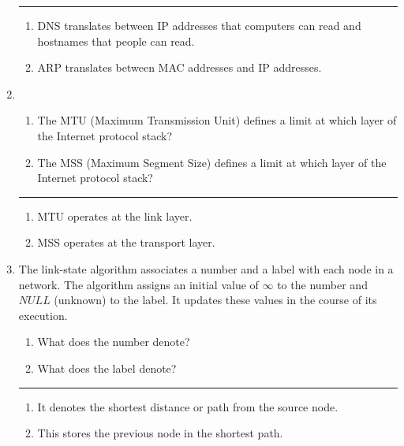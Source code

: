 \documentclass[twoside]{article}
\newenvironment{answer}
  {\vspace*{0.2cm} \rule{12cm}{0.04cm} \vspace*{0.2cm}}
  {\vspace*{0.2cm}}
\begin{document}
\begin{enumerate}
  \begin{answer}

  \begin{enumerate}
    \item DNS translates between IP addresses that computers can read and hostnames that people can read.
    \item ARP translates between MAC addresses and IP addresses.
    \end{enumerate}

    \end{answer}

  \item 
  \begin{enumerate}
    \item The MTU (Maximum Transmission Unit) defines a limit at which
      layer of the Internet protocol stack?
    \item The MSS (Maximum Segment Size) defines a limit at which
      layer of the Internet protocol stack?
    \end{enumerate}

  \begin{answer}

  \begin{enumerate}
    \item MTU operates at the link layer.
    \item MSS operates at the transport layer.
    \end{enumerate}

    \end{answer}

  \item The link-state algorithm associates a number and a label with
    each node in a network. The algorithm assigns an initial value
    of $\infty$ to the number and $NULL$ (unknown) to the label.
    It updates these values in the course of its execution.
  \begin{enumerate}
    \item What does the number denote?
    \item What does the label denote?
    \end{enumerate}
  
  \begin{answer}

  \begin{enumerate}
    \item It denotes the shortest distance or path from the source node.
    \item This stores the previous node in the shortest path.
    \end{enumerate}


\end{answer}
\end{enumerate}
\end{document}
